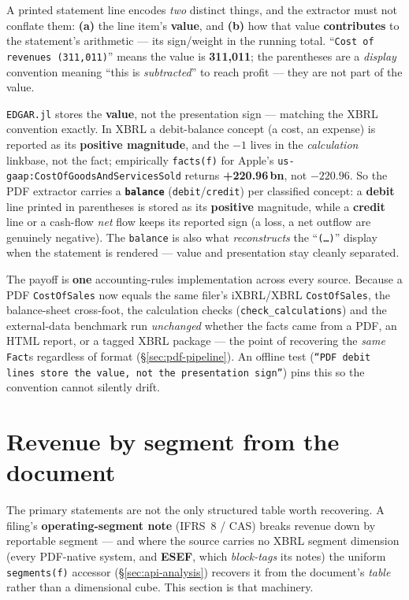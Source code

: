 \documentclass[11pt,a4paper]{report}
\begin{document}
A printed statement line encodes \emph{two} distinct things, and the extractor must not conflate them:
\textbf{(a)} the line item's \textbf{value}, and \textbf{(b)} how that value \textbf{contributes} to the
statement's arithmetic --- its sign/weight in the running total. ``\texttt{Cost of revenues (311,011)}'' means
the value is \textbf{311,011}; the parentheses are a \emph{display} convention meaning ``this is
\emph{subtracted}'' to reach profit --- they are not part of the value.

\texttt{EDGAR.jl} stores the \textbf{value}, not the presentation sign --- matching the XBRL convention
exactly. In XBRL a debit-balance concept (a cost, an expense) is reported as its \textbf{positive magnitude},
and the $-1$ lives in the \emph{calculation} linkbase, not the fact; empirically \texttt{facts(f)} for
Apple's \texttt{us-gaap:CostOfGoodsAndServicesSold} returns \textbf{+220.96\,bn}, not $-220.96$. So the PDF
extractor carries a \textbf{\texttt{balance}} (\texttt{debit}/\texttt{credit}) per classified concept: a
\textbf{debit} line printed in parentheses is stored as its \textbf{positive} magnitude, while a
\textbf{credit} line or a cash-flow \emph{net} flow keeps its reported sign (a loss, a net outflow are
genuinely negative). The \texttt{balance} is also what \emph{reconstructs} the ``\texttt{(\ldots)}'' display
when the statement is rendered --- value and presentation stay cleanly separated.

The payoff is \textbf{one} accounting-rules implementation across every source. Because a PDF
\texttt{CostOfSales} now equals the same filer's iXBRL/XBRL \texttt{CostOfSales}, the balance-sheet
cross-foot, the calculation checks (\texttt{check\_calculations}) and the external-data benchmark run
\emph{unchanged} whether the facts came from a PDF, an HTML report, or a tagged XBRL package --- the point of
recovering the \emph{same} \texttt{Fact}s regardless of format (\S\ref{sec:pdf-pipeline}). An offline test
(\texttt{``PDF debit lines store the value, not the presentation sign''}) pins this so the convention cannot
silently drift.

\section{Revenue by segment from the document}
\label{sec:pdf-segments}

The primary statements are not the only structured table worth recovering. A filing's \textbf{operating-segment
note} (IFRS~8 / CAS) breaks revenue down by reportable segment --- and where the source carries no XBRL segment
dimension (every PDF-native system, and \textbf{ESEF}, which \emph{block-tags} its notes) the uniform
\texttt{segments(f)} accessor (\S\ref{sec:api-analysis}) recovers it from the document's \emph{table} rather
than a dimensional cube. This section is that machinery.
\end{document}
